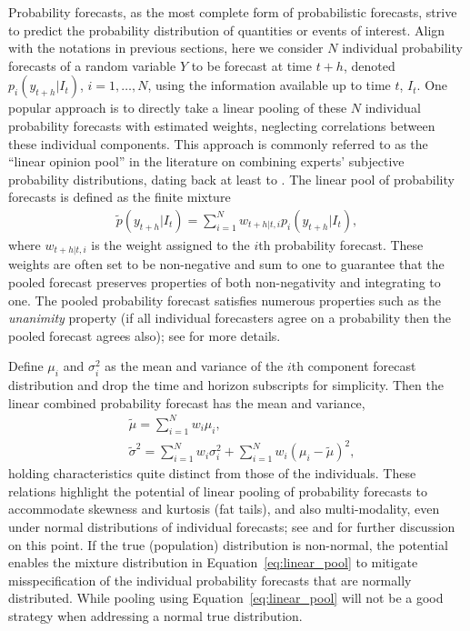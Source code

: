 \documentclass[11pt]{article}
\begin{document}
Probability forecasts, as the most complete form of probabilistic forecasts, strive to predict the probability distribution of quantities or events of interest. Align with the notations in previous sections, here we consider $N$ individual probability forecasts of a random variable $Y$ to be forecast at time $t+h$, denoted $p_{i}(y_{t+h}|I_{t})$, $i=1,\ldots,N$, using the information available up to time $t$, $I_{t}$. One popular approach is to directly take a linear pooling of these $N$ individual probability forecasts with estimated weights, neglecting correlations between these individual components. This approach is commonly referred to as the ``linear opinion pool'' in the literature on combining experts' subjective probability distributions, dating back at least to \citet{Stone1961-zd}. The linear pool of probability forecasts is defined as the finite mixture
\begin{align}
\label{eq:linear_pool}
\tilde{p}(y_{t+h}|I_{t}) = \sum_{i=1}^{N} w_{t+h|t,i} p_{i}(y_{t+h}|I_{t}),
\end{align}
where $w_{t+h|t,i}$ is the weight assigned to the $i$th probability forecast. These weights are often set to be non-negative and sum to one to guarantee that the pooled forecast preserves properties of both non-negativity and integrating to one. The pooled probability forecast satisfies numerous properties such as the \textit{unanimity} property (if all individual forecasters agree on a probability then the pooled forecast agrees also); see \citet{Clemen1999-mh} for more details.

Define $\mu_{i}$ and $\sigma_{i}^{2}$ as the mean and variance of the $i$th component forecast distribution and drop the time and horizon subscripts for simplicity. Then the linear combined probability forecast has the mean and variance,
\begin{align}
& \tilde{\mu} = \sum_{i=1}^{N} w_{i} \mu_{i}, \label{eq:mean_linear_pooling} \\
& \tilde{\sigma}^{2} = \sum_{i=1}^{N} w_{i} \sigma_{i}^{2} + \sum_{i=1}^{N} w_{i} \left(\mu_{i}-\tilde{\mu}\right)^{2}, \label{eq:variance_linear_pooling}
\end{align}
holding characteristics quite distinct from those of the individuals. These relations highlight the potential of linear pooling of probability forecasts to accommodate skewness and kurtosis (fat tails), and also multi-modality, even under normal distributions of individual forecasts; see \citet{Wallis2005-yf} and \citet{Hall2007-lh} for further discussion on this point. If the true (population) distribution is non-normal, the potential enables the mixture distribution in Equation~\eqref{eq:linear_pool} to mitigate misspecification of the individual probability forecasts that are normally distributed. While pooling using Equation~\eqref{eq:linear_pool} will not be a good strategy when addressing a normal true distribution.
\end{document}

